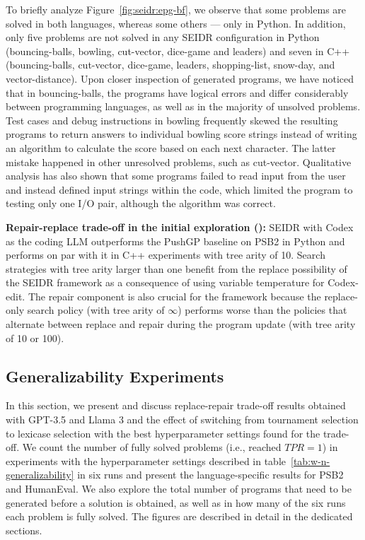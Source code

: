 To briefly analyze Figure~\ref{fig:seidr:epg-bf}, we observe that some problems are solved in both languages, whereas some others --- only in Python. 
In addition, only five problems are not solved in any SEIDR configuration in Python (bouncing-balls, bowling, cut-vector, dice-game and leaders) and seven in C++ (bouncing-balls, cut-vector, dice-game,  leaders, shopping-list, snow-day, and vector-distance).
Upon closer inspection of generated programs, we have noticed that in bouncing-balls, the programs have logical errors and differ considerably between programming languages, as well as in the majority of unsolved problems. 
Test cases and debug instructions in bowling frequently skewed the resulting programs to return answers to individual bowling score strings instead of writing an algorithm to calculate the score based on each next character.
The latter mistake happened in other unresolved problems, such as cut-vector.
Qualitative analysis has also shown that some programs failed to read input from the user and instead defined input strings within the code, which limited the program to testing only one I/O pair, although the algorithm was correct.


\begin{highlight}
\textbf{Repair-replace trade-off in the initial exploration (\rqtreearity{}):} 
SEIDR with Codex as the coding LLM outperforms the PushGP baseline on PSB2 in Python and performs on par with it in C++ experiments with tree arity of 10. 
Search strategies with tree arity larger than one benefit from the replace possibility of the SEIDR framework as a consequence of using variable temperature for Codex-edit.
The repair component is also crucial for the framework because the replace-only search policy (with tree arity of $\infty$) performs worse than the policies that alternate between replace and repair during the program update (with tree arity of 10 or 100).  
\end{highlight} 


\newpage\subsection{Generalizability Experiments}

In this section, we present and discuss replace-repair trade-off results obtained with GPT-3.5 and Llama 3 and the effect of switching from tournament selection to lexicase selection with the best hyperparameter settings found for the trade-off. 
We count the number of fully solved problems (i.e., reached $TPR=1$) in experiments with the hyperparameter settings described in table~\ref{tab:w-n-generalizability} in six runs and present the language-specific results for PSB2 and HumanEval.
We also explore the total number of programs that need to be generated before a solution is obtained, as well as
in how many of the six runs each problem is fully solved.
The figures are described in detail in the dedicated sections. 

